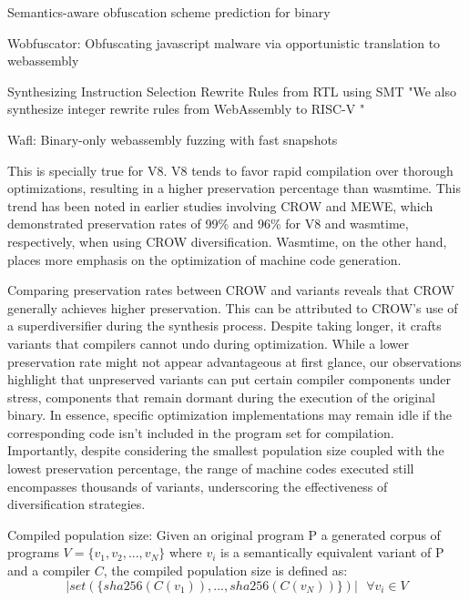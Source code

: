 Semantics-aware obfuscation scheme prediction for binary

Wobfuscator: Obfuscating javascript malware via opportunistic translation to webassembly

Synthesizing Instruction Selection Rewrite Rules from RTL using SMT
"We also synthesize integer rewrite rules from WebAssembly to RISC-V "

Wafl: Binary-only webassembly fuzzing with fast snapshots






This is specially true for V8.
V8 tends to favor rapid compilation over thorough optimizations, resulting in a higher preservation percentage than wasmtime. 
This trend has been noted in earlier studies involving CROW and MEWE, which demonstrated preservation rates of 99\% and 96\% for V8 and wasmtime, respectively, when using CROW diversification. 
Wasmtime, on the other hand, places more emphasis on the optimization of machine code generation.

Comparing preservation rates between CROW and \tool variants reveals that CROW generally achieves higher preservation. 
This can be attributed to CROW's use of a superdiversifier during the synthesis process. 
Despite taking longer, it crafts variants that compilers cannot undo during optimization. 
While a lower preservation rate might not appear advantageous at first glance, our observations highlight that unpreserved variants can put certain compiler components under stress, components that remain dormant during the execution of the original binary. 
In essence, specific optimization implementations may remain idle if the corresponding code isn't included in the \wasm program set for compilation. 
Importantly, despite considering the smallest population size coupled with the lowest preservation percentage, the range of machine codes executed still encompasses thousands of variants, underscoring the effectiveness of diversification strategies.




\begin{metric}{Compiled population size:}\label{metric:popcomp}
Given an original \wasm program P a generated corpus of \wasm programs $V=\{v_1, v_2, ..., v_N\}$ where $v_i$ is a semantically equivalent variant of P and a compiler $C$, the compiled population size is defined as:
$$
    | set(\{ sha256(C(v_1)),..., sha256(C(v_N)) \})|\text{ } \forall v_i \in V 
$$

\end{metric}



